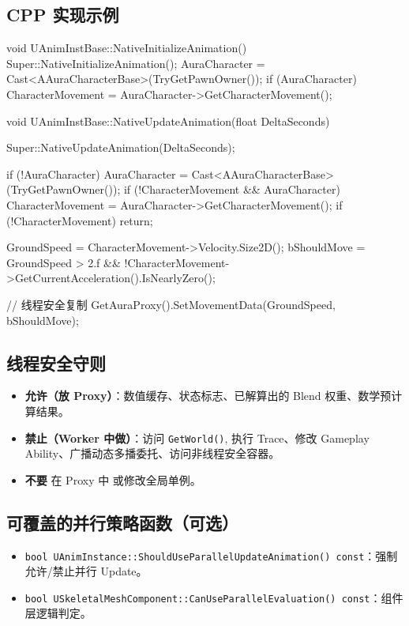 \documentclass[10pt,openright,oneside,CJKmath]{MyBook}
\begin{document}
\subsection*{CPP 实现示例}
\begin{code}[caption={AnimInstBase.cpp 示例}]
void UAnimInstBase::NativeInitializeAnimation()
{
    Super::NativeInitializeAnimation();
    AuraCharacter = Cast<AAuraCharacterBase>(TryGetPawnOwner());
    if (AuraCharacter)
    {
        CharacterMovement = AuraCharacter->GetCharacterMovement();
    }
}

void UAnimInstBase::NativeUpdateAnimation(float DeltaSeconds)
{
    Super::NativeUpdateAnimation(DeltaSeconds);

    if (!AuraCharacter)
        AuraCharacter = Cast<AAuraCharacterBase>(TryGetPawnOwner());
    if (!CharacterMovement && AuraCharacter)
        CharacterMovement = AuraCharacter->GetCharacterMovement();
    if (!CharacterMovement)
        return;

    GroundSpeed = CharacterMovement->Velocity.Size2D();
    bShouldMove = GroundSpeed > 2.f &&
                  !CharacterMovement->GetCurrentAcceleration().IsNearlyZero();

    // 线程安全复制
    GetAuraProxy().SetMovementData(GroundSpeed, bShouldMove);
}
\end{code}

\subsection{线程安全守则}
\begin{itemize}
  \item \textbf{允许（放 Proxy）}：数值缓存、状态标志、已解算出的 Blend 权重、数学预计算结果。
  \item \textbf{禁止（Worker 中做）}：访问 \texttt{GetWorld()}, 执行 Trace、修改 Gameplay Ability、广播动态多播委托、访问非线程安全容器。
  \item \textbf{不要} 在 Proxy 中  或修改全局单例。
\end{itemize}

\subsection{可覆盖的并行策略函数（可选）}
\begin{itemize}
  \item \texttt{bool UAnimInstance::ShouldUseParallelUpdateAnimation() const}：强制允许/禁止并行 Update。
  \item \texttt{bool USkeletalMeshComponent::CanUseParallelEvaluation() const}：组件层逻辑判定。
\end{itemize}
\end{document}
